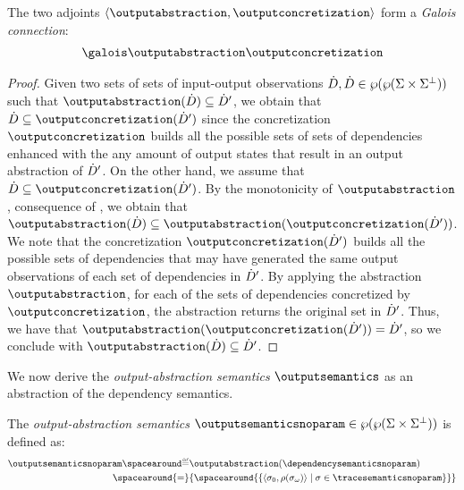 \begin{theorem}
  The two adjoints $\tuple{\outputabstraction}{\outputconcretization}$ form a \emph{Galois connection}:
\begin{align*}
  \galoisbetweensemantics{dependency}{output}
\end{align*}
\end{theorem}
\begin{proof}
  Given two sets of sets of input-output observations $\dot{D}, \dot{D}\in\wp(\wp(\Sigma\times\Sigma^\bot))$ such that $\outputabstraction(\defsetofsetofdependencies)\subseteq\defsetofsetofdependencies'$, we obtain that $\defsetofsetofdependencies\subseteq\outputconcretization(\defsetofsetofdependencies')$ since the concretization $\outputconcretization$ builds all the possible sets of sets of dependencies enhanced with the any amount of output states that result in an output abstraction of $\dot{D}'$.
  On the other hand, we assume that $\defsetofsetofdependencies\subseteq\outputconcretization(\defsetofsetofdependencies')$.
  By the monotonicity of $\outputabstraction$, \cf{} consequence of , we obtain that $\outputabstraction(\defsetofsetofdependencies)\subseteq\outputabstraction(\outputconcretization(\defsetofsetofdependencies'))$.
  We note that the concretization $\outputconcretization(\defsetofsetofdependencies')$ builds all the possible sets of dependencies that may have generated the same output observations of each set of dependencies in $\dot{D}'$. By applying the abstraction $\outputabstraction$, for each of the sets of dependencies concretized by $\outputconcretization$, the abstraction returns the original set in $\dot{D}'$. Thus, we have that $\outputabstraction(\outputconcretization(\defsetofsetofdependencies')) = \defsetofsetofdependencies'$, so we conclude with $\outputabstraction(\defsetofsetofdependencies)\subseteq\defsetofsetofdependencies'$.
\end{proof}

We now derive the \emph{output-abstraction semantics} $\outputsemantics$ as an abstraction of the dependency semantics.

\begin{definition}
  The \emph{output-abstraction semantics} $\outputsemanticsnoparam\in\outputtype$ is defined as:
  \begin{align*}
    \outputsemanticsnoparam\DefeQ&\outputabstraction(\dependencysemanticsnoparam) \\
    \spacearound{=}&
    \{\spacearound{
      \setdef{
        \tuple{\retrieveinput{\deftrace}}{\outputobs(\retrieveoutput{\deftrace})}
      }{
        \deftrace \in \tracesemanticsnoparam
      }
    }\}
  \end{align*}
\end{definition}

